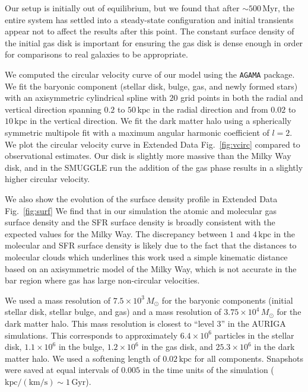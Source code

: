 \documentclass[twoside]{natureprintstyle}
\begin{document}
Our setup is initially out of equilibrium, but we found that after
$\sim500\,\textrm{Myr}$, the entire system has settled into a steady-state
configuration and initial transients appear not to affect the results after
this point. The constant surface density of the initial gas disk is important
for ensuring the gas disk is dense enough in order for comparisons to real
galaxies to be appropriate.

We computed the circular velocity curve of our model using the \texttt{AGAMA}
package.\cite{2019MNRAS.482.1525V} We fit the baryonic component (stellar
disk, bulge, gas, and newly formed stars) with an axisymmetric cylindrical
spline with $20$ grid points in both the radial and vertical direction
spanning $0.2$ to $50\,\textrm{kpc}$ in the radial direction and from $0.02$
to $10\,\textrm{kpc}$ in the vertical direction. We fit the dark matter halo
using a spherically symmetric multipole fit with a maximum angular harmonic
coefficient of $l=2$. We plot the circular velocity curve in Extended Data
Fig.~\ref{fig:vcirc} compared to observational
estimates.\cite{2019ApJ...871..120E} Our disk is slightly more massive than
the Milky Way disk, and in the SMUGGLE run the addition of the gas phase
results in a slightly higher circular velocity.

We also show the evolution of the surface density profile in Extended Data
Fig.~\ref{fig:surf} We find that in our simulation the atomic and molecular
gas surface density and the SFR surface density is broadly consistent with the
expected values for the Milky
Way.\cite{2008AA...487..951K,2022ApJ...929L..18E} The discrepancy between $1$
and $4\,\textrm{kpc}$ in the molecular and SFR surface density is likely due
to the fact that the distances to molecular clouds which underlines this work
used a simple kinematic distance based on an axisymmetric model of the Milky
Way,\cite{2017ApJ...834...57M} which is not accurate in the bar region where
gas has large non-circular velocities.

We used a mass resolution of $7.5\times10^3\,M_{\odot}$ for the baryonic
components (initial stellar disk, stellar bulge, and gas) and a mass
resolution of $3.75\times10^4\,M_{\odot}$ for the dark matter halo. This mass
resolution is closest to ``level 3'' in the AURIGA
simulations.\cite{2017MNRAS.467..179G} This corresponds to approximately
$6.4\times10^6$ particles in the stellar disk, $1.1\times10^6$ in the bulge,
$1.2\times10^6$ in the gas disk, and $25.3\times10^6$ in the dark matter halo.
We used a softening length of $0.02\,\textrm{kpc}$ for all components.
Snapshots were saved at equal intervals of $0.005$ in the time units of the
simulation ($\textrm{kpc}/(\textrm{km}/\textrm{s})\sim1\,\textrm{Gyr}$).
\end{document}
